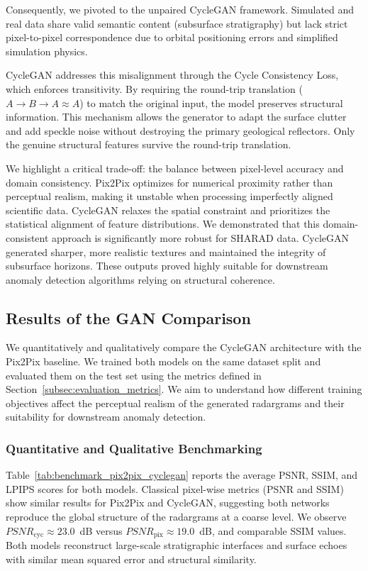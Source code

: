 Consequently, we pivoted to the unpaired CycleGAN framework.
Simulated and real data share valid semantic content (subsurface stratigraphy) but lack strict pixel-to-pixel correspondence due to orbital positioning errors and simplified simulation physics. 

CycleGAN addresses this misalignment through the Cycle Consistency Loss, which enforces transitivity.
By requiring the round-trip translation ($A \rightarrow B \rightarrow A \approx A$) to match the original input, the model preserves structural information.
This mechanism allows the generator to adapt the surface clutter and add speckle noise without destroying the primary geological reflectors.
Only the genuine structural features survive the round-trip translation.

We highlight a critical trade-off: the balance between pixel-level accuracy and domain consistency.
Pix2Pix optimizes for numerical proximity rather than perceptual realism, making it unstable when processing imperfectly aligned scientific data.
CycleGAN relaxes the spatial constraint and prioritizes the statistical alignment of feature distributions.
We demonstrated that this domain-consistent approach is significantly more robust for SHARAD data.
CycleGAN generated sharper, more realistic textures and maintained the integrity of subsurface horizons.
These outputs proved highly suitable for downstream anomaly detection algorithms relying on structural coherence.


\subsection{Results of the GAN Comparison}
\label{subsec:gan_comparison_results}

We quantitatively and qualitatively compare the CycleGAN architecture with the Pix2Pix baseline.
We trained both models on the same dataset split and evaluated them on the test set using the metrics defined in Section~\ref{subsec:evaluation_metrics}.
We aim to understand how different training objectives affect the perceptual realism of the generated radargrams and their suitability for downstream anomaly detection.

\subsubsection{Quantitative and Qualitative Benchmarking}
Table~\ref{tab:benchmark_pix2pix_cyclegan} reports the average PSNR, SSIM, and LPIPS scores for both models.
Classical pixel-wise metrics (PSNR and SSIM) show similar results for Pix2Pix and CycleGAN, suggesting both networks reproduce the global structure of the radargrams at a coarse level.
We observe $PSNR_{\text{cyc}} \approx 23.0$~dB versus $PSNR_{\text{pix}} \approx 19.0$~dB, and comparable SSIM values.
Both models reconstruct large-scale stratigraphic interfaces and surface echoes with similar mean squared error and structural similarity.

